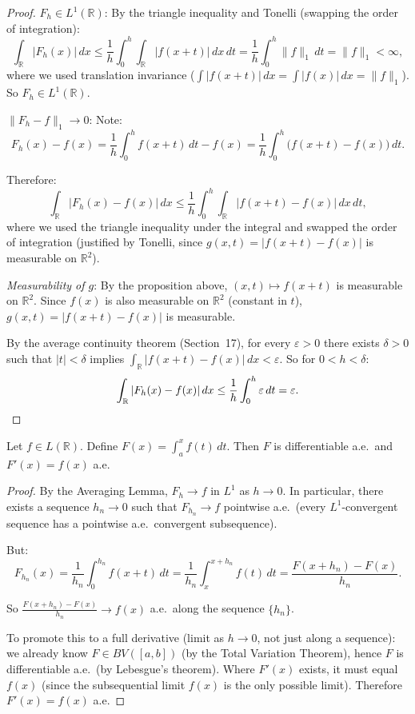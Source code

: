\documentclass[11pt]{report}
\begin{document}
\begin{proof}
\textit{$F_h \in L^1(\mathbb{R})$}: By the triangle inequality and Tonelli (swapping the order of integration):
\[
\int_{\mathbb{R}} |F_h(x)|\,dx \leq \frac{1}{h}\int_0^h \int_{\mathbb{R}} |f(x+t)|\,dx\,dt = \frac{1}{h}\int_0^h \|f\|_1\,dt = \|f\|_1 < \infty,
\]
where we used translation invariance ($\int |f(x+t)|\,dx = \int |f(x)|\,dx = \|f\|_1$). So $F_h \in L^1(\mathbb{R})$.

\textit{$\|F_h - f\|_1 \to 0$}: Note:
\[
F_h(x) - f(x) = \frac{1}{h}\int_0^h f(x+t)\,dt - f(x) = \frac{1}{h}\int_0^h \bigl(f(x+t) - f(x)\bigr)\,dt.
\]

Therefore:
\[
\int_{\mathbb{R}} |F_h(x) - f(x)|\,dx \leq \frac{1}{h}\int_0^h \int_{\mathbb{R}} |f(x+t) - f(x)|\,dx\,dt,
\]
where we used the triangle inequality under the integral and swapped the order of integration (justified by Tonelli, since $g(x,t) = |f(x+t) - f(x)|$ is measurable on $\mathbb{R}^2$).

\textit{Measurability of $g$}: By the proposition above, $(x, t) \mapsto f(x+t)$ is measurable on $\mathbb{R}^2$. Since $f(x)$ is also measurable on $\mathbb{R}^2$ (constant in $t$), $g(x, t) = |f(x+t) - f(x)|$ is measurable.

By the average continuity theorem (Section~17), for every $\varepsilon > 0$ there exists $\delta > 0$ such that $|t| < \delta$ implies $\int_{\mathbb{R}} |f(x+t) - f(x)|\,dx < \varepsilon$. So for $0 < h < \delta$:
\[
\int_{\mathbb{R}} |F_h(x) - f(x)|\,dx \leq \frac{1}{h}\int_0^h \varepsilon\,dt = \varepsilon. \qedhere
\]
\end{proof}

\begin{thmbox}
Let $f \in L(\mathbb{R})$. Define $F(x) = \int_a^x f(t)\,dt$. Then $F$ is differentiable a.e.\ and $F'(x) = f(x)$ a.e.
\end{thmbox}

\begin{proof}
By the Averaging Lemma, $F_h \to f$ in $L^1$ as $h \to 0$. In particular, there exists a sequence $h_n \to 0$ such that $F_{h_n} \to f$ pointwise a.e.\ (every $L^1$-convergent sequence has a pointwise a.e.\ convergent subsequence).

But:
\[
F_{h_n}(x) = \frac{1}{h_n}\int_0^{h_n} f(x+t)\,dt = \frac{1}{h_n}\int_x^{x+h_n} f(t)\,dt = \frac{F(x + h_n) - F(x)}{h_n}.
\]

So $\frac{F(x+h_n) - F(x)}{h_n} \to f(x)$ a.e.\ along the sequence $\{h_n\}$.

To promote this to a full derivative (limit as $h \to 0$, not just along a sequence): we already know $F \in BV([a,b])$ (by the Total Variation Theorem), hence $F$ is differentiable a.e.\ (by Lebesgue's theorem). Where $F'(x)$ exists, it must equal $f(x)$ (since the subsequential limit $f(x)$ is the only possible limit). Therefore $F'(x) = f(x)$ a.e.
\end{proof}
\end{document}
